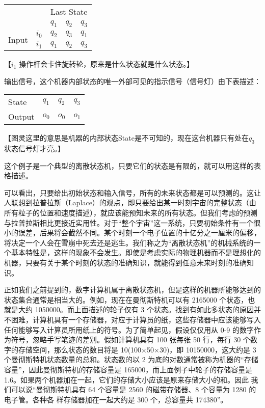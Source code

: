 \documentclass[12pt,a4paper,twoside]{article}
\begin{document}
\begin{table}[H]
\begin{tabular}{ccccc}
                       &                           & \multicolumn{3}{c}{Last State}   \\
                       &                           & $q_1$ & $q_2$ & $q_3$                     \\ \cline{3-5} 
\multirow{2}{*}{Input} & \multicolumn{1}{c|}{$i_0$} & $q_2$  & $q_3$  & \multicolumn{1}{c|}{$q_1$} \\
                       & \multicolumn{1}{c|}{$i_1$} & $q_1$  & $q_2$  & \multicolumn{1}{c|}{$q_3$} \\ \cline{3-5} 
\end{tabular}
\end{table}

【$i_1$ 操作杆会卡住旋转轮，原来是什么状态就是什么状态。】

输出信号，这个机器内部状态的唯一外部可见的指示信号（信号灯）由下表描述：

\begin{table}[H]
\begin{tabular}{llll}
State  & $q_1$ & $q_2$ & $q_3$ \\
Output & $o_0$ & $o_0$ & $o_1$
\end{tabular}
\end{table}

【图灵这里的意思是机器的内部状态State是不可知的，现在这台机器只有处在$q_3$状态信号灯才亮。】

这个例子是一个典型的离散状态机，只要它们的状态是有限的，就可以用这样的表格描述。

可以看出，只要给出初始状态和输入信号，所有的未来状态都是可以预测的。这让人联想到拉普拉斯（Laplace）的观点，即只要给出某一时刻宇宙的完整状态（由所有粒子的位置和速度描述），就应该能预知未来的所有状态。但我们考虑的预测与拉普拉斯相比更接近实用性。对于“整个宇宙”这一系统，只要初始条件有一个很小的误差，后果将会截然不同。某个时刻一个电子位置的十亿分之一厘米的偏移，将决定一个人会在雪崩中死去还是逃生。我们称之为“离散状态机”的机械系统的一个基本特性是，这样的现象不会发生。即使是考虑实际的物理机器而不是理想化的机器，只要有关于某个时刻的状态的准确知识，就能得到任意未来时刻的准确知识。

正如我们之前提到的，数字计算机属于离散状态机，但是这样的机器所能够达到的状态集合通常是相当大的。例如，现在在曼彻斯特机可以有 2165000 个状态，也就是大约 1050000。而上面描述的轮子仅有 3 个状态。找到有如此多状态的原因并不困难，计算机具有一个存储器，对应于计算员的纸，这些存储器中应该能够写入任何能够写入计算员所用纸上的符号。为了简单起见，假设仅仅用从 0-9 的数字作为符号，忽略手写笔迹的差别。假如计算机具有 100 张每张 50 行，每行 30 个数字的存储空间，那么状态的数目将是 10(100×50×30)，即 10150000，这大约是 3 个曼彻斯特机状态数量的总和。状态数的以 2 为底的对数通常被称为机器的“存储容量”，因此曼彻斯特机的存储容量是 165000，而上面例子中轮子的存储容量是 1.6。如果两个机器加在一起，它们的存储大小应该是原来存储大小的和。因此 我们可以说“曼彻斯特机具有 64 个容量是 2560 的磁带存储器、8 个容量为 1280 的电子管。各种各 样存储器加在一起大约是 300 个，总容量共 174380”。
\end{document}
